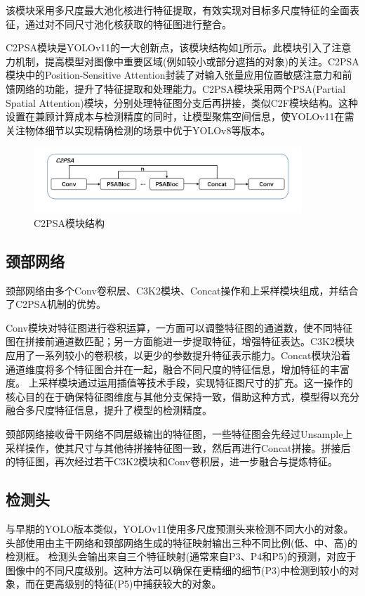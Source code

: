 该模块采用多尺度最大池化核进行特征提取，有效实现对目标多尺度特征的全面表征，通过对不同尺寸池化核获取的特征图进行整合。

C2PSA模块是YOLOv11的一大创新点，该模块结构如\ref{fig:c2psa}所示。此模块引入了注意力机制，提高模型对图像中重要区域(例如较小或部分遮挡的对象)的关注。C2PSA模块中的Position-Sensitive Attention封装了对输入张量应用位置敏感注意力和前馈网络的功能，提升了特征提取和处理能力。C2PSA模块采用两个PSA(Partial Spatial Attention)模块，分别处理特征图分支后再拼接，类似C2F模块结构。这种设置在兼顾计算成本与检测精度的同时，让模型聚焦空间信息，使YOLOv11在需关注物体细节以实现精确检测的场景中优于YOLOv8等版本。

\begin{figure}[!htb]
  \centering
  \includegraphics[width=0.9\textwidth]{figs/chap02/c2psa.png}
  \caption{C2PSA模块结构}
  \label{fig:c2psa}
\end{figure}

\subsection{颈部网络}
颈部网络由多个Conv卷积层、C3K2模块、Concat操作和上采样模块组成，并结合了C2PSA机制的优势。

Conv模块对特征图进行卷积运算，一方面可以调整特征图的通道数，使不同特征图在拼接前通道数匹配；另一方面能进一步提取特征，增强特征表达。C3K2模块应用了一系列较小的卷积核，以更少的参数提升特征表示能力。Concat模块沿着通道维度将多个特征图合并在一起，融合不同尺度的特征信息，增加特征的丰富度。
上采样模块通过运用插值等技术手段，实现特征图尺寸的扩充。这一操作的核心目的在于确保特征图维度与其他分支保持一致，借助这种方式，模型得以充分融合多尺度特征信息，提升了模型的检测精度。

颈部网络接收骨干网络不同层级输出的特征图，一些特征图会先经过Unsample上采样操作，使其尺寸与其他待拼接特征图一致，然后再进行Concat拼接。拼接后的特征图，再次经过若干C3K2模块和Conv卷积层，进一步融合与提炼特征。

\subsection{检测头}
与早期的YOLO版本类似，YOLOv11使用多尺度预测头来检测不同大小的对象。头部使用由主干网络和颈部网络生成的特征映射输出三种不同比例(低、中、高)的检测框。
检测头会输出来自三个特征映射(通常来自P3、P4和P5)的预测，对应于图像中的不同尺度级别。这种方法可以确保在更精细的细节(P3)中检测到较小的对象，而在更高级别的特征(P5)中捕获较大的对象​。

